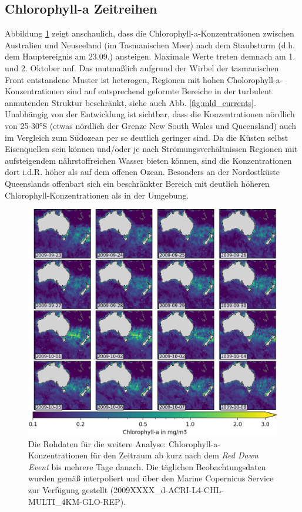 \documentclass[12pt,a4paper,onecolumn]{scrartcl}
\begin{document}
\subsection{Chlorophyll-a Zeitreihen} \label{sec:chla_zeitreihen}
Abbildung \ref{fig:chla_collage} zeigt anschaulich, dass die Chlorophyll-a-Konzentrationen zwischen Australien und Neuseeland (im Tasmanischen Meer) nach dem Staubsturm (d.h. dem Hauptereignis am 23.09.) ansteigen. Maximale Werte treten demnach am 1. und 2. Oktober auf. Das mutmaßlich aufgrund der Wirbel der tasmanischen Front \citep{Gabric.2016} entstandene Muster ist heterogen, Regionen mit hohen Cholorophyll-a-Konzentrationen sind auf entsprechend geformte Bereiche in der turbulent anmutenden Struktur beschränkt, siehe auch Abb. \ref{fig:mld_currents}. Unabhängig von der Entwicklung ist sichtbar, dass die Konzentrationen nördlich von 25-30°S (etwas nördlich der Grenze New South Wales und Queensland) auch im Vergleich zum Südozean per se deutlich geringer sind. Da die Küsten selbst Eisenquellen sein können und/oder je nach Strömungsverhältnissen Regionen mit aufsteigendem nährstoffreichen Wasser bieten können, sind die Konzentrationen dort i.d.R. höher als auf dem offenen Ozean. Besonders an der Nordostküste Queenslands offenbart sich ein beschränkter Bereich mit deutlich höheren Chlorophyll-Konzentrationen als in der Umgebung. 
\begin{figure}
\includegraphics[width=\textwidth]{bilder/chl_collage.png}
\caption{Die Rohdaten für die weitere Analyse: Chlorophyll-a-Konzentrationen für den Zeitraum ab kurz nach dem \textit{Red Dawn Event} bis mehrere Tage danach. Die täglichen Beobachtungsdaten wurden gemäß \cite{Saulquin.2019} interpoliert und über den Marine Copernicus Service zur Verfügung gestellt (2009XXXX_d-ACRI-L4-CHL-MULTI_4KM-GLO-REP).} \label{fig:chla_collage}
\end{figure}
\end{document}
